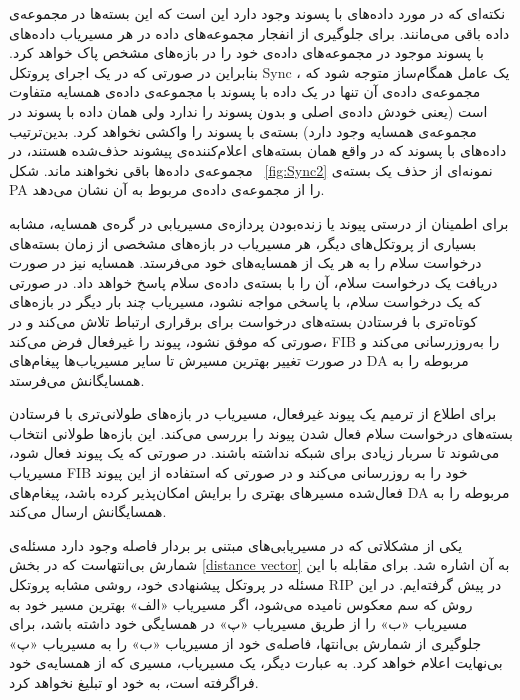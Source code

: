 نکته‌ای که در مورد داده‌های با پسوند  وجود دارد این است که این بسته‌ها در مجموعه‌ی داده باقی می‌مانند. برای جلوگیری از انفجار مجموعه‌های داده در هر مسیریاب داده‌های با پسوند  موجود در مجموعه‌های داده‌ی خود را در بازه‌های مشخص پاک خواهد کرد. بنابراین در صورتی که در یک اجرای پروتکل Sync ، یک عامل همگام‌ساز متوجه شود که مجموعه‌ی داده‌ی آن تنها در یک داده با پسوند  با مجموعه‌ی داده‌ی همسایه متفاوت است (یعنی خودش داده‌ی اصلی و بدون پسوند را ندارد ولی همان داده با پسوند  در مجموعه‌ی همسایه وجود دارد) بسته‌ی با پسوند  را واکشی نخواهد کرد. بدین‌ترتیب داده‌های با پسوند  که در واقع همان بسته‌های اعلام‌کننده‌ی پیشوند حذف‌شده هستند، در مجموعه‌ی داده‌ها باقی نخواهند ماند. شکل ~\ref{fig:Sync2} نمونه‌ای از حذف یک بسته‌ی PA را از مجموعه‌ی داده‌ی مربوط به آن نشان می‌دهد. 



برای اطمینان از درستی پیوند یا زنده‌بودن پردازه‌ی مسیریابی در گره‌ی همسایه، مشابه بسیاری از پروتکل‌های دیگر، هر مسیریاب در بازه‌های مشخصی از زمان بسته‌های درخواست سلام را به هر یک از همسایه‌های خود می‌فرستد. همسایه نیز در صورت دریافت یک درخواست سلام، آن را با بسته‌ی داده‌ی سلام پاسخ خواهد داد. در صورتی که یک درخواست سلام، با پاسخی مواجه نشود، مسیریاب چند بار دیگر در بازه‌های کوتاه‌تری با فرستادن بسته‌های درخواست برای برقراری ارتباط تلاش می‌کند و در صورتی که موفق نشود، پیوند را غیرفعال فرض می‌کند، FIB را به‌روزرسانی می‌کند و در صورت تغییر بهترین مسیرش تا سایر مسیریاب‌ها پیغام‌های DA مربوطه را به همسایگانش می‌فرستد. 

برای اطلاع از ترمیم یک پیوند غیرفعال، مسیریاب در بازه‌های طولانی‌تری با فرستادن بسته‌های درخواست سلام فعال شدن پیوند را بررسی می‌کند. این بازه‌ها طولانی انتخاب می‌شوند تا سربار زیادی برای شبکه نداشته باشند. در صورتی که یک پیوند فعال شود، مسیریاب FIB خود را به روز‌رسانی می‌کند و در صورتی که استفاده از این پیوند فعال‌شده مسیرهای بهتری را برایش امکان‌پذیر کرده باشد، پیغام‌های DA مربوطه را به همسایگانش ارسال می‌کند.

\label{poison}

یکی از مشکلاتی که در مسیریابی‌های مبتنی بر بردار فاصله وجود دارد مسئله‌ی شمارش بی‌انتهاست که در بخش \ref{distance vector}‌ به آن اشاره شد. برای مقابله با این مسئله در پروتکل پیشنهادی خود، روشی مشابه پروتکل RIP در پیش گرفته‌ایم. در این روش که سم معکوس نامیده می‌شود، اگر مسیریاب «الف» بهترین مسیر خود به مسیریاب «ب» را از طریق مسیریاب «پ» در همسایگی خود داشته باشد، برای جلوگیری از شمارش بی‌انتها، فاصله‌ی خود از مسیریاب «ب» را به مسیریاب «پ» بی‌نهایت اعلام خواهد کرد. به عبارت دیگر، یک مسیریاب، مسیری که از همسایه‌ی خود فراگرفته است، به خود او تبلیغ نخواهد کرد. 

